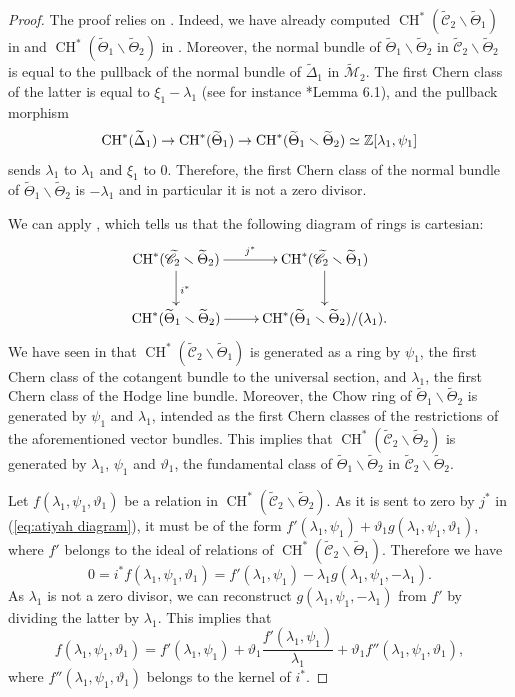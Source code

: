 \documentclass[a4paper, 10pt]{amsart}
\numberwithin{equation}{section}
\numberwithin{subsection}{section}
\theoremstyle{definition}
\theoremstyle{remark}
\renewcommand{\mathcal}{\mathscr}
\newcommand\arr{\ifinner\to\else\longrightarrow\fi}
\newcommand{\Mtilde}{\widetilde{\mathcal M}}
\newcommand{\Ctilde}{\widetilde{\mathcal C}}
\newcommand{\Dtilde}{\widetilde{\Delta}}
\newcommand{\ThTilde}{\widetilde{\Theta}}
\newcommand{\ch}[1][*]{\operatorname{CH}^{#1}}
\begin{document}
	\begin{proof}
		The proof relies on . Indeed, we have already computed $\ch(\Ctilde_2\smallsetminus\ThTilde_1)$ in  and $\ch(\ThTilde_1\smallsetminus\ThTilde_2)$ in . Moreover, the normal bundle of $\ThTilde_1\smallsetminus\ThTilde_2$ in $\Ctilde_2\smallsetminus\ThTilde_2$ is equal to the pullback of the normal bundle of $\Dtilde_1$ in $\Mtilde_2$. The first Chern class of the latter is equal to $\xi_1-\lambda_1$ (see for instance \cite{Lars}*{Lemma 6.1}), and the pullback morphism
		\[ \ch(\Dtilde_1)\arr\ch(\ThTilde_1)\arr\ch(\ThTilde_1\smallsetminus\ThTilde_2)\simeq \ZZ[\lambda_1,\psi_1] \]
		sends $\lambda_1$ to $\lambda_1$ and $\xi_1$ to $0$. Therefore, the first Chern class of the normal bundle of $\ThTilde_1\smallsetminus\ThTilde_2$ is $-\lambda_1$ and in particular it is not a zero divisor.
		
		We can apply , which tells us that the following diagram of rings is cartesian:
		\begin{equation}\label{eq:atiyah diagram} \xymatrix{
				\ch(\Ctilde_2\smallsetminus\ThTilde_2) \ar[r]^{j^*} \ar[d]^{i^*} & \ch(\Ctilde_2\smallsetminus\ThTilde_1) \ar[d] \\
				\ch(\ThTilde_1\smallsetminus\ThTilde_2) \ar[r] & \ch(\ThTilde_1\smallsetminus\ThTilde_2)/(\lambda_1).
		}\end{equation}
		We have seen in  that $\ch(\Ctilde_2\smallsetminus\ThTilde_1)$ is generated as a ring by $\psi_1$, the first Chern class of the cotangent bundle to the universal section, and $\lambda_1$, the first Chern class of the Hodge line bundle. Moreover, the Chow ring of $\ThTilde_1\smallsetminus\ThTilde_2$ is generated by $\psi_1$ and $\lambda_1$, intended as the first Chern classes of the restrictions of the aforementioned vector bundles. This implies that $\ch(\Ctilde_2\smallsetminus\ThTilde_2)$ is generated by $\lambda_1$, $\psi_1$ and $\vartheta_1$, the fundamental class of $\ThTilde_1\smallsetminus\ThTilde_2$ in $\Ctilde_2\smallsetminus\ThTilde_2$.
		
		Let $f(\lambda_1,\psi_1,\vartheta_1)$ be a relation in $\ch(\Ctilde_2\smallsetminus\ThTilde_2)$. As it is sent to zero by $j^*$ in (\ref{eq:atiyah diagram}), it must be of the form $f'(\lambda_1,\psi_1)+\vartheta_1g(\lambda_1,\psi_1,\vartheta_1)$, where $f'$ belongs to the ideal of relations of $\ch(\Ctilde_2\smallsetminus\ThTilde_1)$. Therefore we have
		\[ 0=i^*f(\lambda_1,\psi_1,\vartheta_1)=f'(\lambda_1,\psi_1) - \lambda_1g(\lambda_1,\psi_1,-\lambda_1). \]
		As $\lambda_1$ is not a zero divisor, we can reconstruct $g(\lambda_1,\psi_1,-\lambda_1)$ from $f'$ by dividing the latter by $\lambda_1$. This implies that
		\[ f(\lambda_1,\psi_1,\vartheta_1) = f'(\lambda_1,\psi_1) + \vartheta_1\frac{f'(\lambda_1,\psi_1)}{\lambda_1} + \vartheta_1 f''(\lambda_1,\psi_1,\vartheta_1),\]
		where $f''(\lambda_1,\psi_1,\vartheta_1)$ belongs to the kernel of $i^*$.
		

\end{proof}
\end{document}
